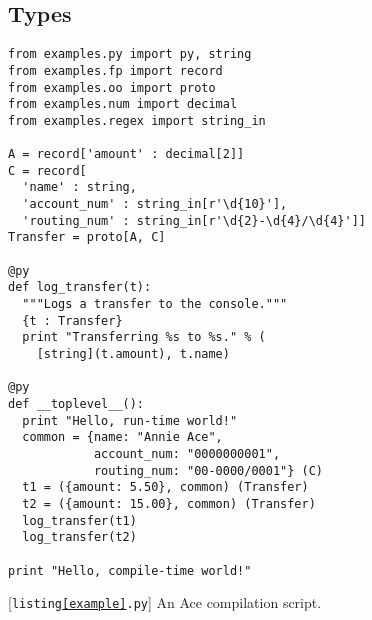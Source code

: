 \documentclass[10pt,preprint]{sigplanconf}
\begin{document}

\subsection{Types}
\begin{codelisting}
\begin{lstlisting}
from examples.py import py, string
from examples.fp import record
from examples.oo import proto
from examples.num import decimal
from examples.regex import string_in

A = record['amount' : decimal[2]]
C = record[
  'name' : string, 
  'account_num' : string_in[r'\d{10}'],
  'routing_num' : string_in[r'\d{2}-\d{4}/\d{4}']]
Transfer = proto[A, C]

@py
def log_transfer(t):
  """Logs a transfer to the console."""
  {t : Transfer}
  print "Transferring %s to %s." % (
    [string](t.amount), t.name)

@py
def __toplevel__():
  print "Hello, run-time world!"
  common = {name: "Annie Ace", 
            account_num: "0000000001", 
            routing_num: "00-0000/0001"} (C)
  t1 = ({amount: 5.50}, common) (Transfer)
  t2 = ({amount: 15.00}, common) (Transfer)
  log_transfer(t1)
  log_transfer(t2)
  
print "Hello, compile-time world!"
\end{lstlisting}
\caption{[\texttt{listing\ref{example}.py}] An Ace compilation script.}
\label{example}
\end{codelisting}
\end{document}
